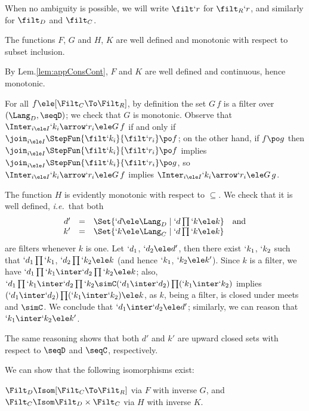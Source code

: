 \documentclass{CSML}
\def\ie{\emph{i.e.}}
\begin{document}
When no ambiguity is possible, we will write $\filt `r$ for $\filt_R `r$, and similarly for $\filt_D$ and $\filt_C$.

 \begin{lem} \label{lem:filterMappingWellDef}
The functions $F$, $G$ and $H$, $K$ are well defined and monotonic with respect to subset inclusion.
 \end{lem}

 \begin{Proof} By Lem.\skp\ref{lem:appConsCont}, $F$ and $K$ are well defined and continuous, hence monotonic. 

For all $f \ele [ \Filt_C\To\Filt_R]$, by definition the set $G\,f$ is a filter over $(\Lang_D, \seqD)$; we check that $G$ is monotonic.
Observe that $\Inter_{i \ele I} `k_i\arrow `r_i \ele G\,f$ if and only if $\join_{i \ele I} \StepFun{\filt `k_i }{ \filt `r_i} \po f$; on the other hand,
if $f \po g$ then $\join_{i \ele I} \StepFun{\filt `k_i }{ \filt `r_i} \po f$ implies $\join_{i \ele I} \StepFun{\filt `k_i }{ \filt `r_i} \po g$, so $\Inter_{i \ele I} `k_i\arrow `r_i \ele G\,f$ implies $\Inter_{i \ele I} `k_i\arrow `r_i \ele G\,g$.

The function $H$ is evidently monotonic with respect to $\subseteq$.
We check that it is well defined, \ie~that both 
%
 \[ \begin{array}{rcll}
d' &=& \Set{`d \ele \Lang_D \mid `d\prod `k \ele k } & \textrm{and} \\
k' &=& \Set{`k \ele \Lang_C \mid `d\prod `k \ele k }
 \end{array} \] 
are filters whenever $k$ is one. 
Let $`d_1$, $`d_2 \ele d'$, then there exist $`k_1$, $`k_2$ such that $`d_1\prod `k_1$, $`d_2\prod `k_2 \ele k$ (and hence $`k_1$, $`k_2 \ele k'$).
Since $k$ is a filter, we have $`d_1\prod `k_1\inter `d_2\prod `k_2 \ele k$; also, $`d_1\prod `k_1\inter `d_2\prod `k_2 \simC (`d_1\inter`d_2)\prod (`k_1\inter`k_2)$ implies $(`d_1\inter`d_2)\prod (`k_1\inter`k_2) \ele k$, as $k$, being a filter, is closed under meets and $\simC$. 
We conclude that $`d_1\inter`d_2 \ele d'$; similarly, we can reason that $`k_1\inter`k_2 \ele k'$. 

The same reasoning shows that both $d'$ and $k'$ are upward closed sets with respect to $\seqD$ and $\seqC$, respectively.
 \end{Proof}

We can show that the following isomorphisms exist: 

 \begin{thm} \label{iso-theorem}
$\Filt_D \Isom [\Filt_C\To\Filt_R]$ via $F$ with inverse $G$, and $\Filt_C \Isom \Filt_D \times \Filt_C$ via $H$ with inverse $K$.
 \end{thm}
\end{document}
